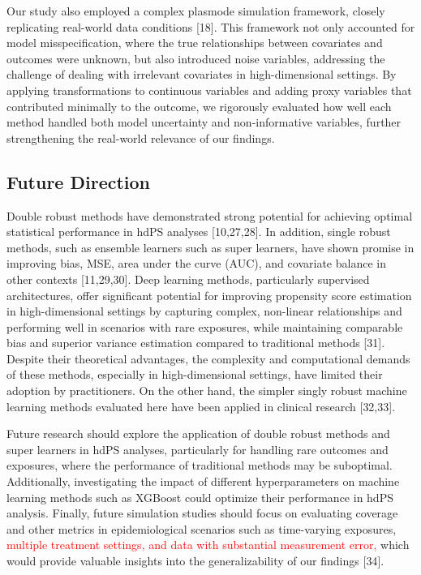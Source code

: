 \documentclass[10pt,letterpaper]{article}
\begin{document}
Our study also employed a complex plasmode simulation framework, closely
replicating real-world data conditions {[}18{]}. This framework not only
accounted for model misspecification, where the true relationships
between covariates and outcomes were unknown, but also introduced noise
variables, addressing the challenge of dealing with irrelevant
covariates in high-dimensional settings. By applying transformations to
continuous variables and adding proxy variables that contributed
minimally to the outcome, we rigorously evaluated how well each method
handled both model uncertainty and non-informative variables, further
strengthening the real-world relevance of our findings.

\subsection{Future Direction}\label{future-direction}

Double robust methods have demonstrated strong potential for achieving
optimal statistical performance in hdPS analyses {[}10,27,28{]}. In
addition, single robust methods, such as ensemble learners such as super
learners, have shown promise in improving bias, MSE, area under the
curve (AUC), and covariate balance in other contexts {[}11,29,30{]}.
Deep learning methods, particularly supervised architectures, offer
significant potential for improving propensity score estimation in
high-dimensional settings by capturing complex, non-linear relationships
and performing well in scenarios with rare exposures, while maintaining
comparable bias and superior variance estimation compared to traditional
methods {[}31{]}. Despite their theoretical advantages, the complexity
and computational demands of these methods, especially in
high-dimensional settings, have limited their adoption by practitioners.
On the other hand, the simpler singly robust machine learning methods
evaluated here have been applied in clinical research {[}32,33{]}.

Future research should explore the application of double robust methods
and super learners in hdPS analyses, particularly for handling rare
outcomes and exposures, where the performance of traditional methods may
be suboptimal. Additionally, investigating the impact of different
hyperparameters on machine learning methods such as XGBoost could
optimize their performance in hdPS analysis. Finally, future simulation
studies should focus on evaluating coverage and other metrics in
epidemiological scenarios such as time-varying exposures,
\textcolor{red}{multiple treatment settings, and data with substantial measurement error,}
which would provide valuable insights into the generalizability of our
findings {[}34{]}.
\end{document}
